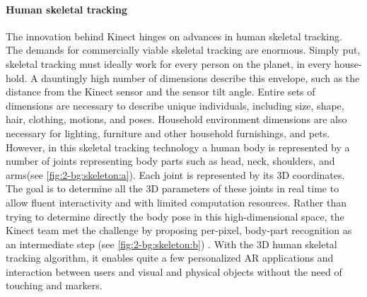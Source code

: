 \paragraph{Human skeletal tracking}
The innovation behind Kinect hinges on advances in human skeletal tracking. 
The demands for commercially viable skeletal tracking are enormous. 
Simply put, skeletal tracking must ideally work for every person on the planet, in every house-hold. A dauntingly high number of dimensions describe this envelope, such as the distance from the Kinect sensor and the sensor tilt angle. 
Entire sets of dimensions are necessary to describe unique individuals, including size, shape, hair, clothing, motions, and poses. Household environment dimensions are also necessary for lighting, furniture and other household furnishings, and pets.
However, in this skeletal tracking technology a human body is represented by a number of joints representing body parts such as head, neck, shoulders, and arms(see \figurename{\ref{fig:2-bg:skeleton:a}}). Each joint is represented by its 3D coordinates. The goal is to determine all the 3D parameters of these joints in real time to allow fluent interactivity and with limited computation resources. 
Rather than trying to determine directly the body pose in this high-dimensional space, the Kinect team met the challenge by proposing per-pixel, body-part recognition as an intermediate step (see \figurename{\ref{fig:2-bg:skeleton:b}}) \cite{Shotton2011}. With the 3D human skeletal tracking algorithm, it enables quite a few personalized AR applications and interaction between users and visual and physical objects without the need of touching and markers.
